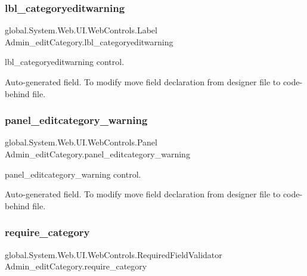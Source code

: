 \subsubsection{\texorpdfstring{lbl\_categoryeditwarning}{lbl\_categoryeditwarning}}
{\footnotesize\ttfamily global.\+System.\+Web.\+U\+I.\+Web\+Controls.\+Label Admin\+\_\+edit\+Category.\+lbl\+\_\+categoryeditwarning\hspace{0.3cm}{\ttfamily [protected]}}



lbl\+\_\+categoryeditwarning control. 

Auto-\/generated field. To modify move field declaration from designer file to code-\/behind file. \mbox{\label{class_admin__edit_category_a9775171591e270ecb04dfba0e76f928e}} 
\subsubsection{\texorpdfstring{panel\_editcategory\_warning}{panel\_editcategory\_warning}}
{\footnotesize\ttfamily global.\+System.\+Web.\+U\+I.\+Web\+Controls.\+Panel Admin\+\_\+edit\+Category.\+panel\+\_\+editcategory\+\_\+warning\hspace{0.3cm}{\ttfamily [protected]}}



panel\+\_\+editcategory\+\_\+warning control. 

Auto-\/generated field. To modify move field declaration from designer file to code-\/behind file. \mbox{\label{class_admin__edit_category_ab8ffa57812449a95e551d52671c5dc6a}} 
\subsubsection{\texorpdfstring{require\_category}{require\_category}}
{\footnotesize\ttfamily global.\+System.\+Web.\+U\+I.\+Web\+Controls.\+Required\+Field\+Validator Admin\+\_\+edit\+Category.\+require\+\_\+category\hspace{0.3cm}{\ttfamily [protected]}}



